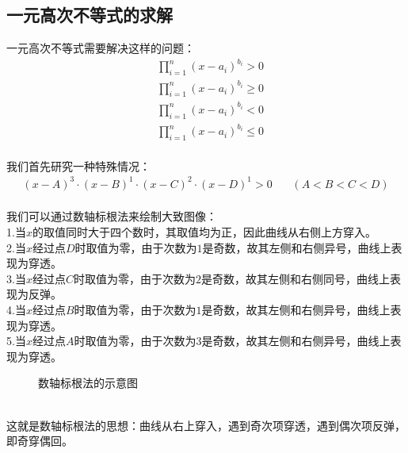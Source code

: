 \documentclass[UTF8]{ctexart}
\begin{document}
\subsection{一元高次不等式的求解}
    一元高次不等式需要解决这样的问题：
    \setcounter{equation}{0}
    \begin{align}
        &\prod_{i=1}^n(x-a_i)^{b_i}>0\\[3mm]
        &\prod_{i=1}^n(x-a_i)^{b_i}\geq 0\\[3mm]
        &\prod_{i=1}^n(x-a_i)^{b_i}<0\\[3mm]
        &\prod_{i=1}^n(x-a_i)^{b_i}\leq 0
    \end{align}\\
    我们首先研究一种特殊情况：
    \begin{align}
        (x-A)^3\cdot(x-B)^1\cdot(x-C)^2\cdot(x-D)^1>0~~~~~~~~(A<B<C<D)
    \end{align}\\
    我们可以通过数轴标根法来绘制大致图像：\\[3mm]
    1.当$x$的取值同时大于四个数时，其取值均为正，因此曲线从右侧上方穿入。\\[3mm]
    2.当$x$经过点$D$时取值为零，由于次数为$1$是奇数，故其左侧和右侧异号，曲线上表现为穿透。\\[3mm]
    3.当$x$经过点$C$时取值为零，由于次数为$2$是奇数，故其左侧和右侧同号，曲线上表现为反弹。\\[3mm]
    4.当$x$经过点$B$时取值为零，由于次数为$1$是奇数，故其左侧和右侧异号，曲线上表现为穿透。\\[3mm]
    5.当$x$经过点$A$时取值为零，由于次数为$3$是奇数，故其左侧和右侧异号，曲线上表现为穿透。
    \begin{figure}[h]
        \begin{center}
            \caption{数轴标根法的示意图}
        \end{center}
    \end{figure}\\
    这就是数轴标根法的思想：曲线从右上穿入，遇到奇次项穿透，遇到偶次项反弹，即奇穿偶回。
\end{document}
